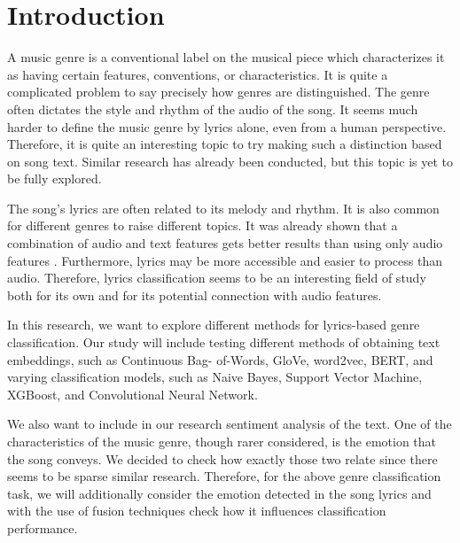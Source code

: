 \section{Introduction}
A music genre is a conventional label on the musical piece which characterizes it as having certain features, conventions, or characteristics. It is quite a complicated problem to say precisely how genres are distinguished. The genre often dictates the style and rhythm of the audio of the song. It seems much harder to define the music genre by lyrics alone, even from a human perspective. Therefore, it is quite an interesting topic to try making such a distinction based on song text. Similar research has already been conducted, but this topic is yet to be fully explored.

The song's lyrics are often related to its melody and rhythm. It is also common for different genres to raise different topics. It was already shown that a combination of audio and text features gets better results than using only audio features \cite{mayer2011Ref}. Furthermore, lyrics may be more accessible and easier to process than audio. Therefore, lyrics classification seems to be an interesting field of study both for its own and for its potential connection with audio features.

In this research, we want to explore different methods for lyrics-based genre classification. Our study will include testing different methods of obtaining text embeddings, such as Continuous Bag-
of-Words, GloVe, word2vec, BERT, and varying classification models, such as Naive Bayes, Support Vector Machine, XGBoost, and Convolutional Neural Network.

We also want to include in our research sentiment analysis of the text. One of the characteristics of the music genre, though rarer considered, is the emotion that the song conveys. We decided to check how exactly those two relate since there seems to be sparse similar research. Therefore, for the above genre classification task, we will additionally consider the emotion detected in the song lyrics and with the use of fusion techniques check how it influences classification performance.
